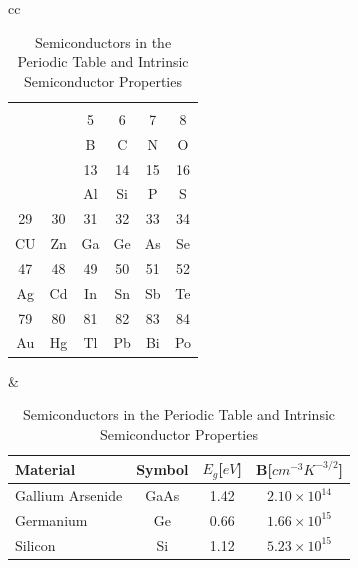 \begin{table}
\caption{Semiconductors in the Periodic Table and Intrinsic Semiconductor Properties}\label{t-PeriodicTable}\label{T:IntSemi}
\begin{tabular}{cc}
\begin{tabular}{|c|c|c|c|c|c|}
\NoSide{IB}    & \NoSide{IIB}   & \NoSide{IIIA}  & \NoSide{IVA}   & \NoSide{VA}    & \NoSide{VIA}   \\
\cline{3-6}
\NoSide{}      & \RtSide{}      & 5              & 6              & 7              & 8              \\
\NoSide{}      & \RtSide{}      & B              & C              & N              & O              \\
\cline{3-6}
\NoSide{}      & \RtSide{}      & 13             & 14             & 15             & 16             \\
\NoSide{}      & \RtSide{}      & Al             & Si             & P              & S              \\
\hline
29             & 30             & 31             & 32             & 33             & 34             \\
CU             & Zn             & Ga             & Ge             & As             & Se             \\
\hline
47             & 48             & 49             & 50             & 51             & 52             \\
Ag             & Cd             & In             & Sn             & Sb             & Te             \\
\hline
79             & 80             & 81             & 82             & 83             & 84             \\
Au             & Hg             & Tl             & Pb             & Bi             & Po             \\
\hline
\end{tabular}
&
\begin{tabular}{lccc}
Material          & Symbol & $E_g$[$eV$] & B[$cm^{-3}K^{-3/2}$]\\\hline
Gallium Arsenide  & GaAs   & 1.42        & $2.10\times 10^{14}$ \\
Germanium         & Ge     & 0.66        & $1.66\times 10^{15}$ \\
Silicon           & Si     & 1.12        & $5.23\times 10^{15}$ \\
\end{tabular}
\\ \end{tabular}
\end{table}

